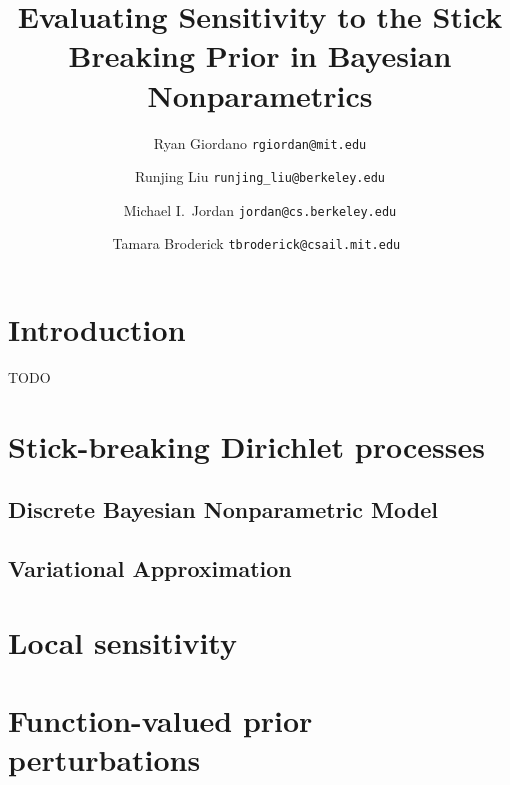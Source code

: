 \documentclass[11pt]{article}
\begin{document}



\title{Evaluating Sensitivity to the Stick Breaking Prior in Bayesian Nonparametrics}

\author{Ryan Giordano \texttt{rgiordan@mit.edu} \\
        \and
        Runjing Liu \texttt{runjing\_liu@berkeley.edu} \\
        \and
        Michael I.\ Jordan \texttt{jordan@cs.berkeley.edu} \\
        \and
        Tamara Broderick \texttt{tbroderick@csail.mit.edu }
        }

\maketitle

\begin{abstract}%

\end{abstract}


\section{Introduction}
TODO
%


\section{Stick-breaking Dirichlet processes}
    \subsection{Discrete Bayesian Nonparametric Model}
    

    \subsection{Variational Approximation}
    


\section{Local sensitivity}


\section{Function-valued prior perturbations}

\end{document}
